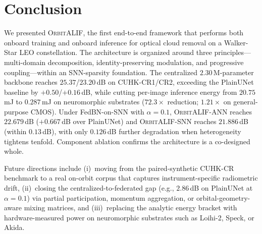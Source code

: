 \documentclass[conference]{IEEEtran}
\newcommand{\OrbitALIF}{\textsc{OrbitALIF}}
\begin{document}
\section{Conclusion}\label{sec:conclusion}

We presented \OrbitALIF{}, the first end-to-end framework that
performs both onboard training and onboard inference for optical
cloud removal on a Walker-Star LEO constellation. The architecture
is organized around three principles---multi-domain decomposition,
identity-preserving modulation, and progressive coupling---within
an SNN-sparsity foundation. The centralized $2.30$\,M-parameter
backbone reaches $25.37$/$23.20$\,dB on CUHK-CR1/CR2, exceeding the
PlainUNet baseline by $+0.50$/$+0.16$\,dB, while cutting per-image
inference energy from $20.75$\,mJ to $0.287$\,mJ on neuromorphic
substrates ($72.3\!\times$ reduction; $1.21\!\times$ on
general-purpose CMOS). Under FedBN-on-SNN with $\alpha\!=\!0.1$,
\OrbitALIF{}-ANN reaches $22.679$\,dB ($+0.667$\,dB over PlainUNet)
and \OrbitALIF{}-SNN reaches $21.886$\,dB (within $0.13$\,dB), with
only $0.126$\,dB further degradation when heterogeneity tightens
tenfold. Component ablation confirms the architecture is a
co-designed whole.

Future directions include (i)~moving from the paired-synthetic
CUHK-CR benchmark to a real on-orbit corpus that captures
instrument-specific radiometric drift, (ii)~closing the
centralized-to-federated gap (e.g., $2.86$\,dB on PlainUNet at
$\alpha\!=\!0.1$) via partial participation, momentum aggregation,
or orbital-geometry-aware mixing matrices, and (iii)~replacing the
analytic energy bracket with hardware-measured power on
neuromorphic substrates such as Loihi-2, Speck, or Akida.

\end{document}
